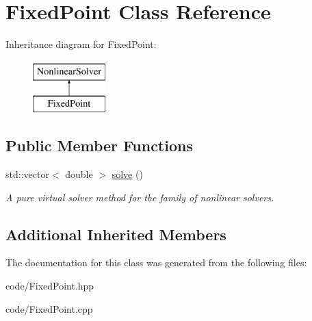 \hypertarget{class_fixed_point}{}\section{Fixed\+Point Class Reference}
\label{class_fixed_point}
Inheritance diagram for Fixed\+Point\+:\begin{figure}[H]
\begin{center}
\leavevmode
\includegraphics[height=2.000000cm]{class_fixed_point}
\end{center}
\end{figure}
\subsection*{Public Member Functions}
\begin{DoxyCompactItemize}
\item 
std\+::vector$<$ double $>$ \hyperlink{class_fixed_point_a73e252968b7c3c5852fc2c5aefa8d0c0}{solve} ()\hypertarget{class_fixed_point_a73e252968b7c3c5852fc2c5aefa8d0c0}{}\label{class_fixed_point_a73e252968b7c3c5852fc2c5aefa8d0c0}

\begin{DoxyCompactList}\small\item\em A pure virtual solver method for the family of nonlinear solvers. \end{DoxyCompactList}\end{DoxyCompactItemize}
\subsection*{Additional Inherited Members}


The documentation for this class was generated from the following files\+:\begin{DoxyCompactItemize}
\item 
code/Fixed\+Point.\+hpp\item 
code/Fixed\+Point.\+cpp\end{DoxyCompactItemize}

